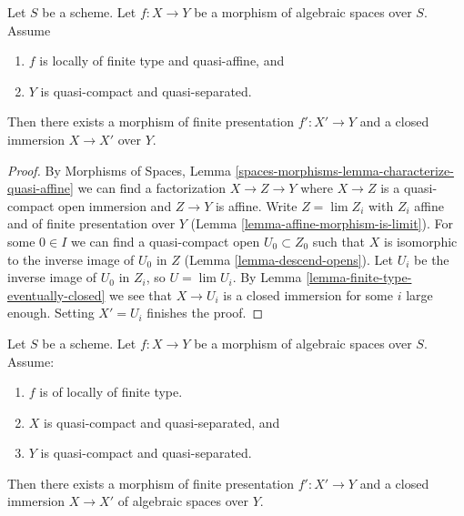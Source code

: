 \begin{lemma}
\label{lemma-quasi-affine-closed-in-finite-presentation}
Let $S$ be a scheme. Let $f : X \to Y$ be a morphism of algebraic spaces
over $S$. Assume
\begin{enumerate}
\item $f$ is locally of finite type and quasi-affine, and
\item $Y$ is quasi-compact and quasi-separated.
\end{enumerate}
Then there exists a morphism of finite presentation
$f' : X' \to Y$ and a closed immersion $X \to X'$ over $Y$.
\end{lemma}

\begin{proof}
By Morphisms of Spaces, Lemma
\ref{spaces-morphisms-lemma-characterize-quasi-affine}
we can find a factorization $X \to Z \to Y$ where
$X \to Z$ is a quasi-compact open immersion and
$Z \to Y$ is affine. Write $Z = \lim Z_i$ with $Z_i$ affine and
of finite presentation over $Y$ (Lemma \ref{lemma-affine-morphism-is-limit}).
For some $0 \in I$ we can find a quasi-compact open $U_0 \subset Z_0$
such that $X$ is isomorphic to the inverse image of $U_0$ in $Z$
(Lemma \ref{lemma-descend-opens}). Let $U_i$ be the inverse image of
$U_0$ in $Z_i$, so $U = \lim U_i$. By
Lemma \ref{lemma-finite-type-eventually-closed}
we see that $X \to U_i$ is a closed immersion for some $i$ large enough.
Setting $X' = U_i$ finishes the proof.
\end{proof}

\begin{lemma}
\label{lemma-finite-type-closed-in-finite-presentation}
Let $S$ be a scheme. Let $f : X \to Y$ be a morphism of algebraic spaces
over $S$. Assume:
\begin{enumerate}
\item $f$ is of locally of finite type.
\item $X$ is quasi-compact and quasi-separated, and
\item $Y$ is quasi-compact and quasi-separated.
\end{enumerate}
Then there exists a morphism of finite presentation
$f' : X' \to Y$ and a closed immersion $X \to X'$ of
algebraic spaces over $Y$.
\end{lemma}

